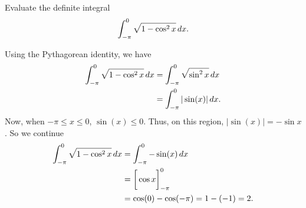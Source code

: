 \documentclass[noauthor]{ximera}
\begin{document}
\begin{problem}
Evaluate the definite integral
$$
\int_{- \pi}^0 \sqrt{1 - \cos^2 x} \mathop{}\!d x.
$$
\end{problem}

\begin{freeResponse}
Using the Pythagorean identity, we have
\begin{align*}
		\int_{- \pi}^0 \sqrt{1 - \cos^2 x} \mathop{}\!d x
		&= \int_{- \pi}^0 \sqrt{\sin^2 x} \mathop{}\!d x  \\
		&= \int_{- \pi}^0 | \sin (x) | \mathop{}\!d x.
		\end{align*}
	Now, when $-\pi \leq x \leq 0$, $\sin (x) \leq 0$.  
	Thus, on this region, $|\sin (x) | = - \sin x$.
	So we continue
		\begin{align*}
		\int_{- \pi}^0 \sqrt{1 - \cos^2 x} \mathop{}\!d x
		&= \int_{- \pi}^0 - \sin (x) \mathop{}\!d x  \\
		&= \bigg[ \cos x \bigg]_{-\pi}^0  \\
		&= \cos(0) - \cos(-\pi) = 1 - (-1) = 2.
		\end{align*}
\end{freeResponse}
\end{document}
